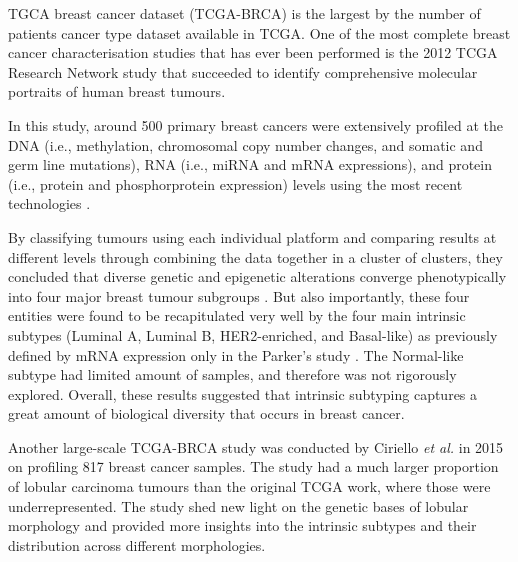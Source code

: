     TGCA breast cancer dataset (TCGA-BRCA) is the largest by the number of patients cancer type dataset available in TCGA. One of the most complete breast cancer characterisation studies that has ever been performed is the 2012 TCGA Research Network study \cite{TCGAResearchNetwork2012} that succeeded to identify comprehensive molecular portraits of human breast tumours. 
    
    In this study, around 500 primary breast cancers were extensively profiled at the DNA (i.e., methylation, chromosomal copy number changes, and somatic and germ line mutations), RNA (i.e., miRNA and mRNA expressions), and protein (i.e., protein and phosphorprotein expression) levels using the most recent technologies \cite{TCGAResearchNetwork2012, Vidal2017}.
    
    By classifying tumours using each individual platform and comparing results at different levels through combining the data together in a cluster of clusters, they concluded that diverse genetic and epigenetic alterations converge phenotypically into four major breast tumour subgroups \cite{TCGAResearchNetwork2012}. But also importantly, these four entities were found to be recapitulated very well by the four main intrinsic subtypes (Luminal A, Luminal B, HER2-enriched, and Basal-like) as previously defined by mRNA expression only in the Parker’s study \cite{ParkerSupervisedSubtypes}. The Normal-like subtype had limited amount of samples, and therefore was not rigorously explored. Overall, these results suggested that intrinsic subtyping captures a great amount of biological diversity that occurs in breast cancer. 
    
    Another large-scale TCGA-BRCA study was conducted by Ciriello \textit{et al.} in 2015 \cite{Ciriello2015ComprehensiveCancer} on profiling 817 breast cancer samples. The study had a much larger proportion of lobular carcinoma tumours than the original TCGA work, where those were underrepresented. The study shed new light on the genetic bases of lobular morphology and provided more insights into the intrinsic subtypes and their distribution across different morphologies. 
    
    
    
   
    
    
    
    




    
    
    
    
